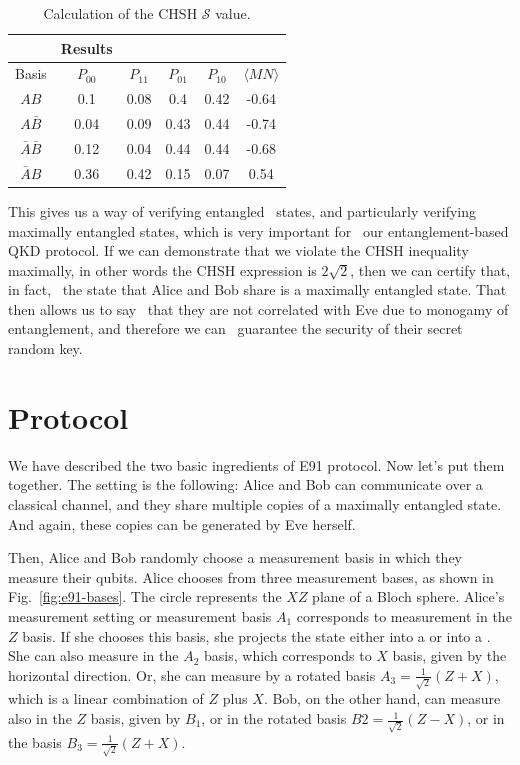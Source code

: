 

\begin{table}[t]
    \centering
    \begin{tabular}{c|c|c|c|c|c}
          & Results \\\hline
         Basis & $P_{00}$ & $P_{11}$ & $P_{01}$ & $P_{10}$ & $\langle MN \rangle$ \\
         \hline
        $AB$ & 0.1 & 0.08 & 0.4 & 0.42 & -0.64 \\
         $A\bar{B}$ & 0.04 & 0.09 & 0.43 & 0.44 & -0.74 \\
        $\bar{A}\bar{B}$ & 0.12 & 0.04 & 0.44 & 0.44 & -0.68 \\
         $\bar{A}B$ & 0.36 & 0.42 & 0.15 & 0.07 & 0.54 \\
\hline
\end{tabular}
    \caption{Calculation of the CHSH $\mathcal{S}$ value.}
    \label{tab:chsh-calculation}
\end{table}


This gives us a way of verifying entangled 
states, and particularly verifying maximally
entangled states, which is very important for 
our entanglement-based QKD protocol. If we can
demonstrate that we violate the CHSH inequality 
maximally, in other words the CHSH expression is
$2\sqrt{2}$, then we can certify that, in fact, 
the state that Alice and Bob share is a maximally
entangled state. That then allows us to say 
that they are not correlated with Eve due
to monogamy of entanglement, and therefore we can 
guarantee the security of their secret random key.

\section{Protocol}


We have described the two basic ingredients of E91 protocol. Now let's put them together. The setting is the following: Alice and Bob can communicate over a classical channel, and they share multiple copies of a maximally entangled state. And again, these copies can be generated by Eve herself.

Then, Alice and Bob randomly choose a measurement basis in which they measure their qubits. Alice chooses from three measurement bases, as shown in Fig.~\ref{fig:e91-bases}. The circle represents the $XZ$ plane of a Bloch sphere. Alice's measurement setting or measurement basis $A_1$ corresponds to measurement in the $Z$ basis. If she chooses this basis, she projects the state either into a  or into a . She can also measure in the $A_2$ basis, which corresponds to $X$ basis, given by the horizontal direction. Or, she can measure by a rotated basis $A_3=\frac{1}{\sqrt{2}}(Z+X)$, which is a linear combination of $Z$ plus $X$. Bob, on the other hand, can measure also in the $Z$ basis, given by $B_1$, or in the rotated basis $B2 = \frac{1}{\sqrt{2}}(Z-X)$, or in the basis $B_3=\frac{1}{\sqrt{2}}(Z+X)$.


